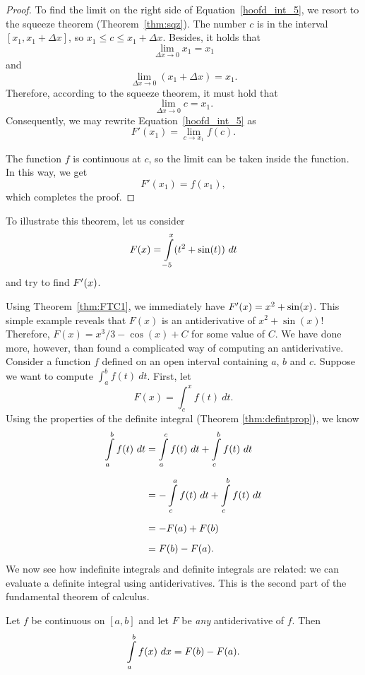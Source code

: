 \begin{proof}
To find the limit on the right side of Equation~\eqref{hoofd_int_5}, we resort to the squeeze theorem (Theorem~\ref{thm:sqz}). The number $c$ is in the interval $[x_1, x_1 + \Delta x]$, so $x_1 \leq c \leq x_1 + \Delta x$. Besides, it holds that 
$$
\displaystyle \lim _{\Delta x\to 0}x_{1}=x_{1}
$$
and 
$$
\displaystyle \lim _{\Delta x\to 0}\left(x_{1}+\Delta x\right)=x_{1}.
$$
Therefore, according to the squeeze theorem, it must hold that
$$
\displaystyle \lim _{\Delta x\to 0}c=x_{1}.
$$
Consequently, we may rewrite  Equation~\eqref{hoofd_int_5} as
$$
\displaystyle F'(x_{1})=\lim _{c\to x_{1}}f(c).
$$

The function $f$ is continuous at $c$, so the limit can be taken inside the function. In this way, we get
$$
\displaystyle F'(x_{1})=f(x_{1}),
$$
which completes the proof.
\end{proof}

\fi

To illustrate this theorem, let us consider
$$\ds F(x) = \ds \int\limits_{-5}^x (t^2+\sin (t))\ dt$$
and try to find $F'(x)$. 

Using Theorem~\ref{thm:FTC1}, we immediately have $F'(x) = x^2+\sin (x)$.  This simple example reveals that $F(x)$ is an antiderivative of $x^2+\sin (x)$! Therefore, $F(x) = x^3/3-\cos (x)+C$ for some value of $C$.  We have done more, however, than found a complicated way of computing an antiderivative. Consider a function $f$ defined on an open interval containing $a$, $b$ and $c$. Suppose we want to compute $\int_a^b f(t)\ dt$. First, let 
$$F(x) = \int_c^x f(t)\ dt.$$
Using the properties of the definite integral (Theorem \ref{thm:defintprop}), we know 
		\begin{align*}\displaystyle \int\limits_a^b f(t)\ dt &= \displaystyle \int\limits_a^c f(t)\ dt + \displaystyle \int\limits_c^b f(t)\ dt \\[0.2cm]
											&= -\displaystyle \int\limits_c^a f(t)\ dt + \displaystyle \int\limits_c^b f(t)\ dt \\[0.2cm]
											&=-F(a) + F(b)\\[0.2cm]
											&= F(b) - F(a).
		\end{align*}
We now see how indefinite integrals and definite integrals are related: we can evaluate a definite integral using antiderivatives.  This is the second part of the fundamental theorem of calculus.

\begin{theorem}\label{thm:FTC2}
Let $f$ be continuous on $[a,b]$ and let $F$ be \textit{any} antiderivative of $f$. Then$$\displaystyle \int\limits_a^b f(x)\ dx = F(b) - F(a).$$
\end{theorem}

